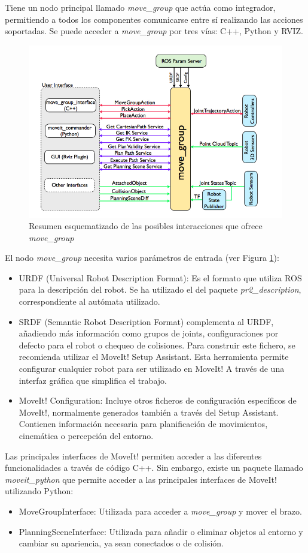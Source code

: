 \documentclass[12pt,spanish,chapterprefix, numbers=noenddot]{book}
\numberwithin{equation}{section}
\numberwithin{figure}{section}
\begin{document}
Tiene un nodo principal llamado \textit{move\_group } que actúa como integrador, permitiendo a todos los componentes comunicarse entre sí realizando las acciones soportadas. 
Se puede acceder a \textit{move\_group } por tres vías: C++, Python y RVIZ.
\begin{figure}[hbt!]
\centering
\includegraphics[width=12cm]{Figs/moveGroup.png}
\par
\caption{\label{fig:moveGroup}Resumen esquematizado de las posibles interacciones que ofrece \textit{move\_group}}
\end{figure}
El nodo \textit{move\_group} necesita varios parámetros de entrada (ver Figura \ref{fig:moveGroup}):
\begin{itemize}
\item URDF (Universal Robot Description Format): Es el formato que utiliza ROS para la descripción del robot. Se ha utilizado el del paquete \textit{pr2\_description}, correspondiente al autómata utilizado.
\item SRDF (Semantic Robot Description Format) complementa al URDF, añadiendo más información como grupos de joints, configuraciones por defecto para el robot o chequeo de colisiones. Para construir este fichero, se recomienda utilizar el MoveIt! Setup Assistant. Esta herramienta permite configurar cualquier robot para ser utilizado en MoveIt! A través de una interfaz gráfica que simplifica el trabajo. 
\item MoveIt! Configuration: Incluye otros ficheros de configuración específicos de MoveIt!, normalmente generados también a través del Setup Assistant. Contienen información necesaria para planificación de movimientos, cinemática o percepción del entorno.
\end{itemize}
Las principales interfaces de MoveIt! permiten acceder a las diferentes funcionalidades a través de código C++. Sin embargo, existe un paquete llamado \textit{moveit\_python} que permite acceder a las principales interfaces de MoveIt! utilizando Python:
\begin{itemize}
\item MoveGroupInterface: Utilizada para acceder a \textit{move\_group } y mover el brazo. 
\item PlanningSceneInterface: Utilizada para añadir o eliminar objetos al entorno y cambiar su apariencia, ya sean conectados o de colisión. 
\end{itemize}
\end{document}
